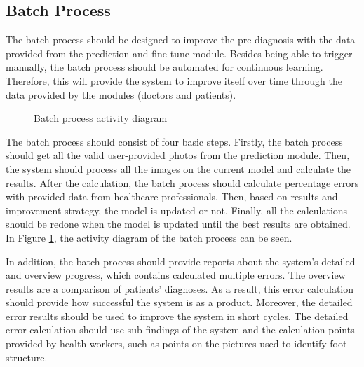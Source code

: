 \subsection{ Batch Process }

The batch process should be designed to improve the pre-diagnosis with the data provided from the prediction and fine-tune module. Besides being able to trigger manually, the batch process should be automated for continuous learning. Therefore, this will provide the system to improve itself over time through the data provided by the modules (doctors and patients). 

\begin{figure}[htbp]
\centering
{}
\caption{Batch process activity diagram}
\label{fig:BatchProcessActivityDiagram}
\end{figure}

The batch process should consist of four basic steps. Firstly, the batch process should get all the valid user-provided photos from the prediction module. Then, the system should process all the images on the current model and calculate the results. After the calculation, the batch process should calculate percentage errors with provided data from healthcare professionals. Then, based on results and improvement strategy, the model is updated or not. Finally, all the calculations should be redone when the model is updated until the best results are obtained. In Figure \ref{fig:BatchProcessActivityDiagram}, the activity diagram of the batch process can be seen.

In addition, the batch process should provide reports about the system's detailed and overview progress, which contains calculated multiple errors. The overview results are a comparison of patients' diagnoses. As a result, this error calculation should provide how successful the system is as a product. Moreover, the detailed error results should be used to improve the system in short cycles. The detailed error calculation should use sub-findings of the system and the calculation points provided by health workers, such as points on the pictures used to identify foot structure. 

